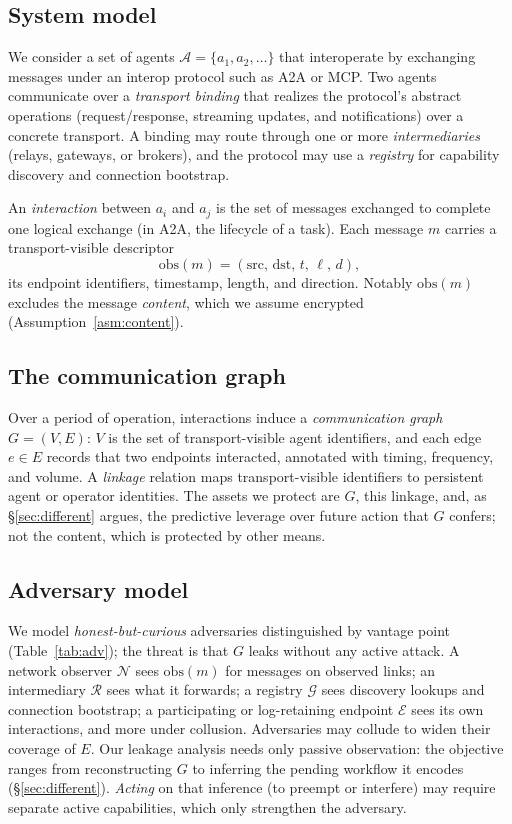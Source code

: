 \documentclass[10pt,twocolumn]{article}
\theoremstyle{definition}
\begin{document}
\subsection{System model}
We consider a set of agents $\mathcal{A}=\{a_1,a_2,\dots\}$ that interoperate by
exchanging messages under an interop protocol such as A2A or MCP. Two agents
communicate over a \emph{transport binding} that realizes the protocol's abstract
operations (request/response, streaming updates, and notifications) over a
concrete transport. A binding may route through one or more \emph{intermediaries}
(relays, gateways, or brokers), and the protocol may use a \emph{registry} for
capability discovery and connection bootstrap.

An \emph{interaction} between $a_i$ and $a_j$ is the set of messages exchanged to
complete one logical exchange (in A2A, the lifecycle of a task). Each message $m$
carries a transport-visible descriptor
\[
  \mathrm{obs}(m) = (\mathrm{src},\,\mathrm{dst},\,t,\,\ell,\,d),
\]
its endpoint identifiers, timestamp, length, and direction. Notably
$\mathrm{obs}(m)$ excludes the message \emph{content}, which we assume encrypted
(Assumption~\ref{asm:content}).

\subsection{The communication graph}
Over a period of operation, interactions induce a \emph{communication graph}
$G=(V,E)$: $V$ is the set of transport-visible agent identifiers, and each edge
$e\in E$ records that two endpoints interacted, annotated with timing, frequency,
and volume. A \emph{linkage} relation maps transport-visible identifiers to
persistent agent or operator identities. The assets we protect are $G$, this
linkage, and, as \S\ref{sec:different} argues, the predictive leverage over future
action that $G$ confers; not the content, which is protected by other means.

\subsection{Adversary model}
We model \emph{honest-but-curious} adversaries distinguished by vantage point
(Table~\ref{tab:adv}); the threat is that $G$ leaks without any active attack. A
network observer $\mathcal{N}$ sees $\mathrm{obs}(m)$ for messages on observed
links; an intermediary $\mathcal{R}$ sees what it forwards; a registry
$\mathcal{G}$ sees discovery lookups and connection bootstrap; a participating or
log-retaining endpoint $\mathcal{E}$ sees its own interactions, and more under
collusion. Adversaries may collude to widen their coverage of $E$. Our leakage analysis needs
only passive observation: the objective ranges from reconstructing $G$ to inferring
the pending workflow it encodes (\S\ref{sec:different}). \emph{Acting} on that
inference (to preempt or interfere) may require separate active capabilities,
which only strengthen the adversary.
\end{document}
